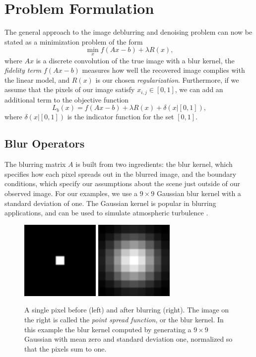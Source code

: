 \documentclass[10pt,a4paper]{article}
\begin{document}
\section{Problem Formulation}
The general approach to the image deblurring and denoising problem can now be stated as a minimization problem of the form
\begin{equation} \label{general}
 \min_x f(Ax -b) + \lambda R(x),
\end{equation}
where $Ax$ is a discrete convolution of the true image with a blur kernel, the  \emph{fidelity term} $f(Ax-b)$ measures how well the recovered image complies with the linear model, and $R(x)$ is our chosen \emph{regularization}. Furthermore, if we assume that the pixels of our image satisfy $x_{i,j} \in [0,1]$, we can add an additional term to the objective function
\begin{equation} \label{loss}
 L_b(x) = f(Ax-b) + \lambda R(x) + \delta(x | [0,1] ),
\end{equation}
where $\delta(x | [0,1])$ is the indicator function for the set $[0,1]$. 

\subsection{Blur Operators}
The blurring matrix $A$ is built from two ingredients: the blur kernel, which specifies how each pixel spreads out in the blurred image, and the boundary conditions, which specify our assumptions about the scene just outside of our observed image. For our examples, we use a $9 \times 9$ Gaussian blur kernel with a standard deviation of one. The Gaussian kernel is popular in blurring applications, and can be used to simulate atmospheric turbulence \cite{DeblurBook}. 

\begin{figure}[H]
\centering
\includegraphics[width=1.5in]{../figures/pixel} \hspace{2em}
\includegraphics[width=1.5in]{../figures/psf}
\caption{A single pixel before (left) and after blurring (right). The image on the right is called the \emph{point spread function}, or the blur kernel. In this example the blur kernel computed by generating a $9 \times 9$ Gaussian with mean zero and standard deviation one, normalized so that the pixels sum to one.  }
\end{figure}
\end{document}
